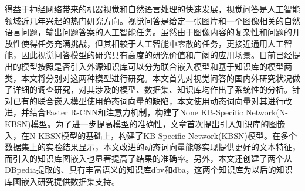 	
\begin{chineseabstract}
得益于神经网络带来的机器视觉和自然语言处理的快速发展，视觉问答是人工智能领域近几年兴起的热门研究方向。视觉问答是给定一张图片和一个图像相关的自然语言问题，输出问题答案的人工智能任务。虽然由于图像内容的复杂性和问题的开放性使得任务充满挑战，但其相较于人工智能中零散的任务，更接近通用人工智能，因此视觉问答模型的研究具有高度的研究价值和广阔的应用场景。目前已经提出的模型按照是否引入外源知识库可以分为联合嵌入模型和基于知识库的模型两类，本文将分别对这两种模型进行研究。本文首先对视觉问答的国内外研究状况做了详细的调查研究，对其涉及的模型、数据集、知识库均作出了系统性的分析。针对已有的联合嵌入模型使用静态词向量的缺陷，本文使用动态词向量对其进行改进，并结合Faster R-CNN和注意力机制，构建了None KB-Specific Network(N-KBSN)模型。为了进一步提高模型的准确性，文章首次提出引入知识库的图嵌入，在N-KBSN模型的基础上，构建了KB-Specific Network(KBSN)模型。在多个数据集上的实验结果显示，本文改进的动态词向量能够实现提供更好的文本特征，而引入的知识库图嵌入也显著提高了结果的准确率。另外，本文还创建了两个从DBpedia提取的、具有丰富语义的知识库dbv和dba，这两个知识库为以后的知识库图嵌入研究提供数据集支持。

\end{chineseabstract}

